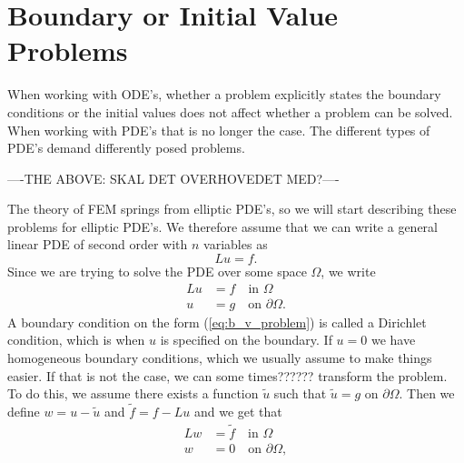 \section{Boundary or Initial Value Problems}
When working with ODE's,
whether a problem explicitly states the boundary conditions 
or the initial values does not affect whether a problem can be solved.
When working with 
PDE's that is no longer the case. The different types 
of PDE's demand differently posed problems. 


----THE ABOVE: SKAL DET OVERHOVEDET MED?----


The theory of FEM springs from elliptic PDE's, so we will start 
describing these problems for elliptic PDE's.
We therefore assume that we can write a general linear PDE of second 
order with $n$ variables as 
\begin{equation*}
    Lu = f.
\end{equation*}
Since we are trying to solve the PDE over some space $\Omega$, we write
\begin{align}
    Lu &= f \quad \text{in } \Omega \label{eq:b_v_problem} \\
    u &= g \quad \text{on } \partial \Omega. \nonumber
\end{align}
A boundary condition on the form (\ref{eq:b_v_problem}) is called a 
Dirichlet condition, which is when $u$ is specified on the boundary. 
If $u=0$ we have homogeneous boundary conditions, which we usually assume 
to make things easier. If that is not the case, we can some times?????? 
transform the problem. To do this, we assume there exists a function 
$\tilde{u}$ such that $\tilde{u}=g$ on $\partial \Omega$. Then we define 
$w = u - \tilde{u}$ and $\tilde{f}=f-Lu$ and we get that
\begin{align}
    Lw &= \tilde{f} \quad \text{in } \Omega \label{eq:b_v_problem} \\
    w &= 0 \quad \text{on } \partial \Omega, \nonumber
\end{align}
